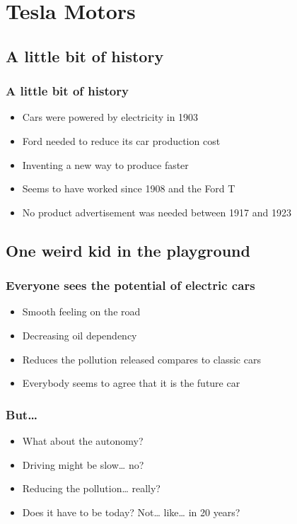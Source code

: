     \section{Tesla Motors}

\subsection{A little bit of history}
\begin{frame}
\frametitle{A little bit of history}
\begin{itemize}
    \itemsep1em
    \item Cars were powered by electricity in 1903
    \item Ford needed to reduce its car production cost
    \item Inventing a new way to produce faster %
    \item Seems to have worked since 1908 and the Ford T
    \item No product advertisement was needed between 1917 and 1923
\end{itemize}
\end{frame}

\subsection{One weird kid in the playground}
\begin{frame}
\frametitle{Everyone sees the potential of electric cars}
\begin{itemize}
    \itemsep1.5em
    \item Smooth feeling on the road
    \item Decreasing oil dependency
    \item Reduces the pollution released compares to classic cars
    \item Everybody seems to agree that it is the future car
\end{itemize}
\end{frame}

\begin{frame}
\frametitle{But…}
\begin{itemize}
    \itemsep1.5em
    \item What about the autonomy?
    \item Driving might be slow… no?
    \item Reducing the pollution… really? %
    \item Does it have to be today? Not… like… in 20 years?
\end{itemize}
\end{frame}

